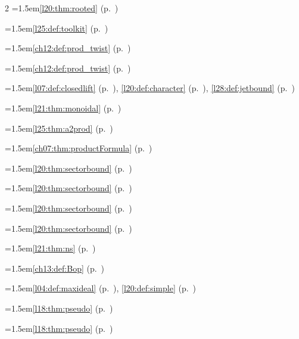 \begin{multicols}{2}
\hangindent=1.5em\quad \ref{l20:thm:rooted} (p.~\pageref{l20:thm:rooted})\par
\hangindent=1.5em\quad \ref{l25:def:toolkit} (p.~\pageref{l25:def:toolkit})\par
\hangindent=1.5em\quad \ref{ch12:def:prod_twist} (p.~\pageref{ch12:def:prod_twist})\par
\hangindent=1.5em\quad \ref{ch12:def:prod_twist} (p.~\pageref{ch12:def:prod_twist})\par
\hangindent=1.5em\quad \ref{l07:def:closedlift} (p.~\pageref{l07:def:closedlift}), \ref{l20:def:character} (p.~\pageref{l20:def:character}), \ref{l28:def:jetbound} (p.~\pageref{l28:def:jetbound})\par
\hangindent=1.5em\quad \ref{l21:thm:monoidal} (p.~\pageref{l21:thm:monoidal})\par
\hangindent=1.5em\quad \ref{l25:thm:a2prod} (p.~\pageref{l25:thm:a2prod})\par
\hangindent=1.5em\quad \ref{ch07:thm:productFormula} (p.~\pageref{ch07:thm:productFormula})\par
\hangindent=1.5em\quad \ref{l20:thm:sectorbound} (p.~\pageref{l20:thm:sectorbound})\par
\hangindent=1.5em\quad \ref{l20:thm:sectorbound} (p.~\pageref{l20:thm:sectorbound})\par
\hangindent=1.5em\quad \ref{l20:thm:sectorbound} (p.~\pageref{l20:thm:sectorbound})\par
\hangindent=1.5em\quad \ref{l20:thm:sectorbound} (p.~\pageref{l20:thm:sectorbound})\par
\hangindent=1.5em\quad \ref{l21:thm:ns} (p.~\pageref{l21:thm:ns})\par
\hangindent=1.5em\quad \ref{ch13:def:Bop} (p.~\pageref{ch13:def:Bop})\par
\hangindent=1.5em\quad \ref{l04:def:maxideal} (p.~\pageref{l04:def:maxideal}), \ref{l20:def:simple} (p.~\pageref{l20:def:simple})\par
\hangindent=1.5em\quad \ref{l18:thm:pseudo} (p.~\pageref{l18:thm:pseudo})\par
\hangindent=1.5em\quad \ref{l18:thm:pseudo} (p.~\pageref{l18:thm:pseudo})\par

\end{multicols}
